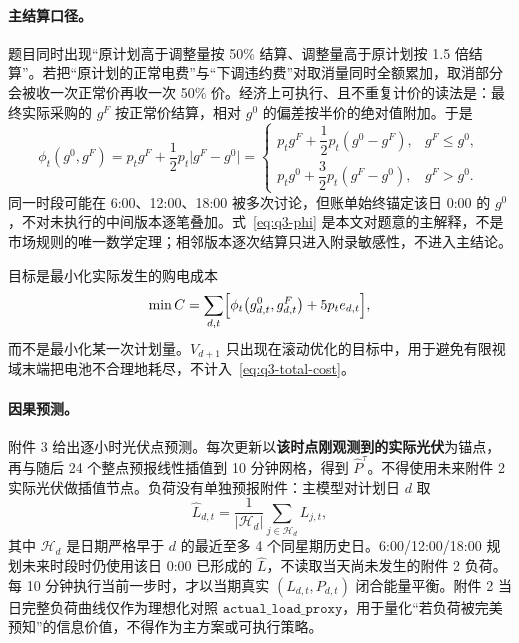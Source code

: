 \paragraph{主结算口径。}
题目同时出现“原计划高于调整量按 50\% 结算、调整量高于原计划按 1.5 倍结算”。若把“原计划的正常电费”与“下调违约费”对取消量同时全额累加，取消部分会被收一次正常价再收一次 50\% 价。经济上可执行、且不重复计价的读法是：最终实际采购的 \(g^{F}\) 按正常价结算，相对 \(g^{0}\) 的偏差按半价的绝对值附加。于是
\begin{equation}
\label{eq:q3-phi}
\phi_t(g^{0},g^{F})=p_t g^{F}+\frac12 p_t\lvert g^{F}-g^{0}\rvert
=
\begin{cases}
p_t g^{F}+\dfrac12 p_t(g^{0}-g^{F}), & g^{F}\le g^{0},\\[4pt]
p_t g^{0}+\dfrac32 p_t(g^{F}-g^{0}), & g^{F}>g^{0}.
\end{cases}
\end{equation}
同一时段可能在 6:00、12:00、18:00 被多次讨论，但账单始终锚定该日 0:00 的 \(g^{0}\)，不对未执行的中间版本逐笔叠加。式~\eqref{eq:q3-phi} 是本文对题意的主解释，不是市场规则的唯一数学定理；相邻版本逐次结算只进入附录敏感性，不进入主结论。

目标是最小化实际发生的购电成本
\begin{equation}
\label{eq:q3-total-cost}
\min C=\sum_{d,t}\Bigl[\phi_t\bigl(g^{0}_{d,t},g^{F}_{d,t}\bigr)+5p_t e_{d,t}\Bigr],
\end{equation}
而不是最小化某一次计划量。\(V_{d+1}\) 只出现在滚动优化的目标中，用于避免有限视域末端把电池不合理地耗尽，不计入~\eqref{eq:q3-total-cost}。

\paragraph{因果预测。}
附件 3 给出逐小时光伏点预测。每次更新以\textbf{该时点刚观测到的实际光伏}为锚点，再与随后 24 个整点预报线性插值到 10 分钟网格，得到 \(\widehat P^{\tau}\)。不得使用未来附件 2 实际光伏做插值节点。负荷没有单独预报附件：主模型对计划日 \(d\) 取
\begin{equation}
\label{eq:q3-load}
\widehat L_{d,t}=\frac1{|\mathcal H_d|}\sum_{j\in\mathcal H_d}L_{j,t},
\end{equation}
其中 \(\mathcal H_d\) 是日期严格早于 \(d\) 的最近至多 4 个同星期历史日。6:00/12:00/18:00 规划未来时段时仍使用该日 0:00 已形成的 \(\widehat L\)，不读取当天尚未发生的附件 2 负荷。每 10 分钟执行当前一步时，才以当期真实 \((L_{d,t},P_{d,t})\) 闭合能量平衡。附件 2 当日完整负荷曲线仅作为理想化对照 \(\texttt{actual\_load\_proxy}\)，用于量化“若负荷被完美预知”的信息价值，不得作为主方案或可执行策略。


